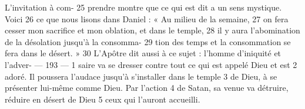 L'invitation à com-	 
25	 	prendre montre que ce qui est dit a un sens mystique. Voici	 
26	 	ce que nous lisons dans Daniel : « Au milieu de la semaine,	 
27	 	on fera cesser mon sacrifice et mon oblation, et dans le temple,	 
28	 	il y aura l'abomination de la désolation jusqu'à la consomma-	 
29	 	tion des temps et la consommation se fera dans le désert. »	 
30	 	L'Apôtre dit aussi à ce sujet : l'homme d'iniquité et l'adver-	 
 	--- 193 ---	 
1	 	saire va se dresser contre tout ce qui est appelé Dieu et est	 
2	 	adoré. Il poussera l'audace jusqu'à s'installer dans le temple	 
3	 	de Dieu, à se présenter lui-même comme Dieu. Par l'action	 
4	 	de Satan, sa venue va détruire, réduire en désert de Dieu	 
5	 	ceux qui l'auront accueilli.
